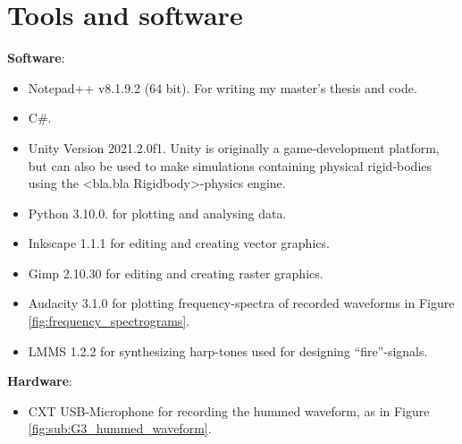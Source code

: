 \chapter{Tools and software}
\label{chap:tools_and_software}
	
	\textbf{Software}:
	\begin{itemize}
		\item Notepad++ v8.1.9.2 (64 bit). For writing my master's thesis and code.
		
		\item C\#.
		
		\item Unity Version 2021.2.0f1. Unity is originally a game-development platform, but can also be used to make  simulations containing physical rigid-bodies using the <bla.bla Rigidbody>-physics engine.
		
		\item Python 3.10.0. for plotting and analysing data.
		
		\item Inkscape 1.1.1 for editing and creating vector graphics.
		
		\item Gimp 2.10.30 for editing and creating raster graphics.
		
		\item Audacity 3.1.0 for plotting frequency-spectra of recorded waveforms in Figure \ref{fig:frequency_spectrograms}.
		
		\item LMMS 1.2.2 for synthesizing harp-tones used for designing ``fire''-signals.
	\end{itemize}
	
	\textbf{Hardware}:
	\begin{itemize}
		\item CXT USB-Microphone for recording the hummed waveform, as in Figure \ref{fig:sub:G3_hummed_waveform}.
	\end{itemize}
	
